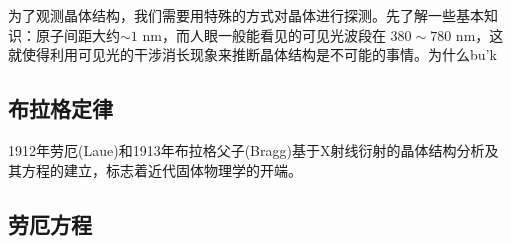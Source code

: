 
为了观测晶体结构，我们需要用特殊的方式对晶体进行探测。先了解一些基本知识：原子间距大约$\sim 1$ nm，而人眼一般能看见的可见光波段在 $380 \sim 780 $ nm，这就使得利用可见光的干涉消长现象来推断晶体结构是不可能的事情。为什么bu'k
\subsection{布拉格定律}
1912年劳厄(Laue)和1913年布拉格父子(Bragg)基于X射线衍射的晶体结构分析及其方程的建立，标志着近代固体物理学的开端。


\subsection{劳厄方程}
